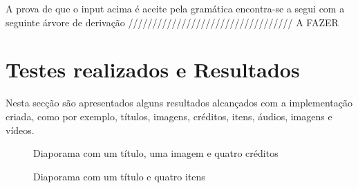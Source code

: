 \documentclass[11pt,a4paper]{report}
\begin{document}
A prova de que o input acima é aceite pela gramática encontra-se a segui com a seguinte árvore de derivação
////////////////////////////////// A FAZER


\section{Testes realizados e Resultados}

Nesta secção são apresentados alguns resultados alcançados com a implementação criada, como por exemplo, títulos, imagens, créditos, itens, áudios, imagens e vídeos.

\begin{figure}[H]
\centering
{}
\caption{Diaporama com um título, uma imagem e quatro créditos}
\label{img:exemplo1}
\end{figure}

\begin{figure}[H]
\centering
{}
\caption{Diaporama com um título e quatro itens}
\label{img:exemplo3}
\end{figure}
\end{document}
